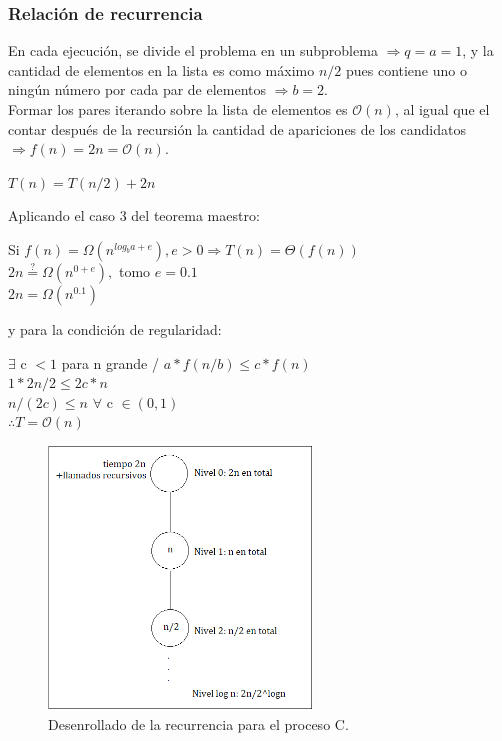 \subsubsection{Relación de recurrencia}
 En cada ejecución, se divide el problema en un subproblema $\Rightarrow q = a = 1$, y la cantidad de elementos en la lista es como máximo $n/2$ pues contiene uno o ningún número por cada par de elementos $\Rightarrow b=2$.\\
Formar los pares iterando sobre la lista de elementos es $\mathcal{O}(n)$, al igual que el contar después de la recursión 
la cantidad de apariciones de los candidatos $\Rightarrow f(n) = 2n = \mathcal{O}(n)$. 
	\begin{center}
	    $T(n) = T(n/2) + 2n $\\
	\end{center}
Aplicando el caso 3 del teorema maestro:
\begin{center}
    \doublespacing Si $f(n) = \Omega(n^{log_{b}{a}+e}),  e>0 \Rightarrow T(n) = \Theta(f(n))$\\
    \doublespacing$2n \stackrel{?}{=} \Omega(n^{0+e}),$ tomo $e=0.1$\\
    \doublespacing$2n = \Omega(n^{0.1})$ 
\end{center}
y para la condición de regularidad:
\begin{center}
    \doublespacing$\exists$ c $< 1$ para n grande / $a*f(n/b) \leq c*f(n) $\\
    \doublespacing$1 * 2n/2 \leq 2c*n$\\
    \doublespacing$n/(2c) \leq n$  $\forall$ c $\in (0,1)$\\
    \doublespacing$\therefore T = \mathcal{O}(n)$
\end{center}

\begin{figure}[!h]
\includegraphics[width=7cm]{Informe/Imagenes/Parte2/proceso c.png}
\centering
\caption{Desenrollado de la recurrencia para el proceso C.}
\label{fig:desenrollado}
\end{figure}

